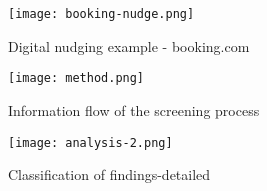 
\begin{figure}[h]
    \centering
    \texttt{[image: booking-nudge.png]}
    \caption{Digital nudging example - booking.com}
    \label{fig:booking}
\end{figure}

\newpage

\begin{figure}[h]
    \centering
    \texttt{[image: method.png]}
    \caption{Information flow of the screening process}
    \label{fig:method}
\end{figure}

\newpage

\begin{figure}[h!]
    \centering
    \texttt{[image: analysis-2.png]}
    \caption{Classification of findings-detailed}
    \label{fig:analysis-detail}
\end{figure}
